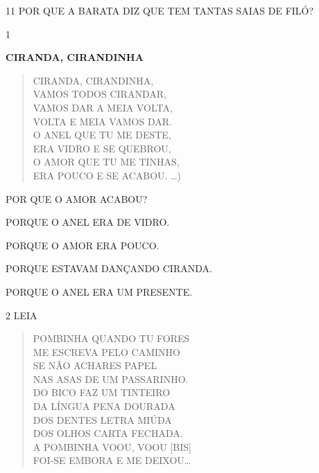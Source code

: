 
\num{11} POR QUE A BARATA DIZ QUE TEM TANTAS SAIAS DE FILÓ?




\num{1}

\textbf{CIRANDA, CIRANDINHA}

\begin{verse}
CIRANDA, CIRANDINHA,\\
VAMOS TODOS CIRANDAR,\\
VAMOS DAR A MEIA VOLTA,\\
VOLTA E MEIA VAMOS DAR.\\
O ANEL QUE TU ME DESTE,\\
ERA VIDRO E SE QUEBROU,\\
O AMOR QUE TU ME TINHAS,\\
ERA POUCO E SE ACABOU. \ldots{})
\end{verse}


POR QUE O AMOR ACABOU?

\begin{escolha}
\item PORQUE O ANEL ERA DE VIDRO.

\item PORQUE O AMOR ERA POUCO.

\item PORQUE ESTAVAM DANÇANDO CIRANDA.

\item PORQUE O ANEL ERA UM PRESENTE.
\end{escolha}

\num{2} LEIA

\begin{verse}
POMBINHA QUANDO TU FORES\\
ME ESCREVA PELO CAMINHO\\
SE NÃO ACHARES PAPEL\\
NAS ASAS DE UM PASSARINHO.\\
DO BICO FAZ UM TINTEIRO\\
DA LÍNGUA PENA DOURADA\\
DOS DENTES LETRA MIÚDA\\
DOS OLHOS CARTA FECHADA.\\
A POMBINHA VOOU, VOOU [BIS]\\
FOI-SE EMBORA E ME DEIXOU\ldots{}
\end{verse}


